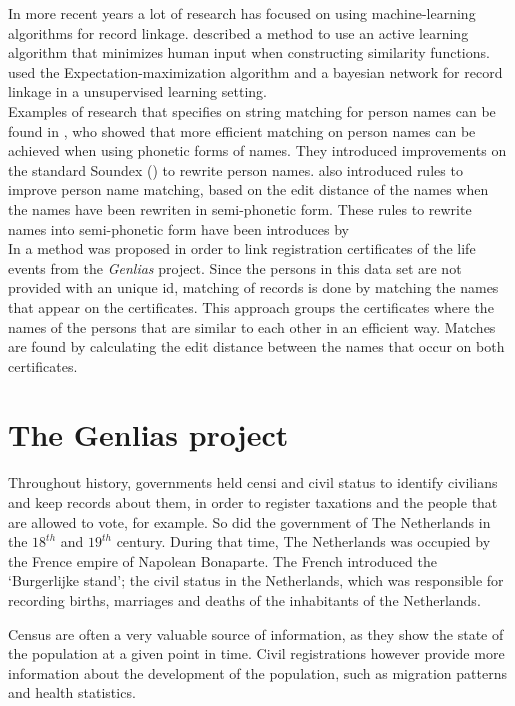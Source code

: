 In more recent years a lot of research has focused on using machine-learning algorithms for record linkage. \cite{sarawagi2002alias} described a method to use an active learning algorithm that minimizes human input when constructing similarity functions. \cite{winkler2002methods} used the Expectation-maximization algorithm and a bayesian network for record linkage in a unsupervised learning setting. \\

Examples of research that specifies on string matching for person names can be found in \cite{zobel1996phonetic}, who showed that more efficient matching on person names can be achieved when using phonetic forms of names. They introduced improvements on the standard Soundex (\cite{russell1918soundex}) to rewrite person names. \cite{bloothooft2014learning} also introduced rules to improve person name matching, based on the edit distance of the names when the names have been rewriten in semi-phonetic form. These rules to rewrite names into semi-phonetic form have been introduces by \cite{bloothooft1995rules}\\

In \cite{Aspects001} a method was proposed in order to link registration certificates of the life events from the \textit{Genlias} project. Since the persons in this data set are not provided with an unique id, matching of records is done by matching the names that appear on the certificates. This approach groups the certificates where the names of the persons that are similar to each other in an efficient way. Matches are found by calculating the edit distance between the names that occur on both certificates.\\

\section{The Genlias project}
Throughout history, governments held censi and civil status to identify civilians and keep records about them, in order to register taxations and the people that are allowed to vote, for example. So did the government of The Netherlands in the $18^{th}$ and $19^{th}$ century. During that time, The Netherlands was occupied by the Frence empire of Napolean Bonaparte. The French introduced the `Burgerlijke stand'; the civil status in the Netherlands, which was responsible for recording births, marriages and deaths of the inhabitants of the Netherlands. 

Census are often a very valuable source of information, as they show the state of the population at a given point in time. Civil registrations however provide more information about the development of the population, such as migration patterns and health statistics.

